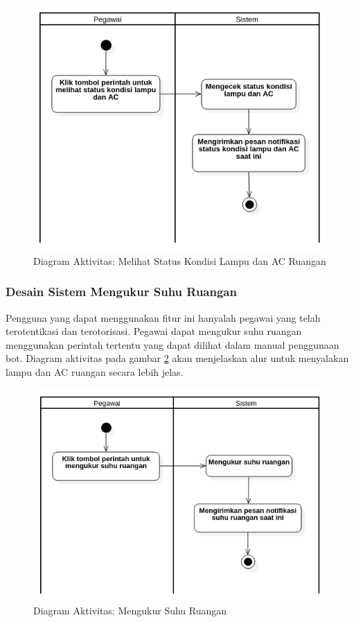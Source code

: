 \begin{figure}[H]
	\centerline {
		\includegraphics[width=\linewidth]{bab4/img/activity_diagram_melihatstatus.png}
	}
	\caption{Diagram Aktivitas: Melihat Status Kondisi Lampu dan AC Ruangan}
	\label{figure:activity_3}
\end{figure}

\subsubsection{Desain Sistem Mengukur Suhu Ruangan}
\tab Pengguna yang dapat menggunakan fitur ini hanyalah pegawai yang telah terotentikasi dan terotorisasi. Pegawai dapat mengukur suhu ruangan menggunakan perintah tertentu yang dapat dilihat dalam manual penggunaan bot. Diagram aktivitas pada gambar \ref{figure:activity_4} akan menjelaskan alur untuk menyalakan lampu dan AC ruangan secara lebih jelas.

\begin{figure}[H]
	\centerline {
		\includegraphics[width=\linewidth]{bab4/img/activity_diagram_mengukursuhu.png}
	}
	\caption{Diagram Aktivitas: Mengukur Suhu Ruangan}
	\label{figure:activity_4}
\end{figure}
